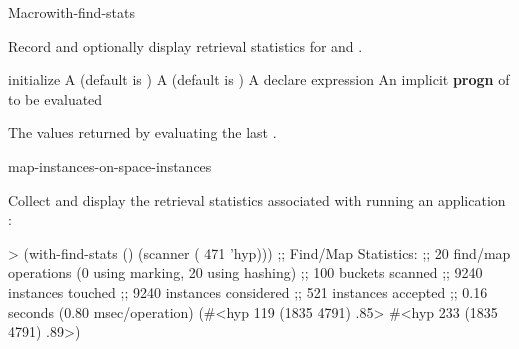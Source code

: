 \documentclass[10pt,twoside,english,pdftex]{article}
\begin{document}
\begin{functiondoc}{Macro}{with-find-stats}%
  {\code{(} \code{)}
    \superstar{}
    \superstar{} 
    \returns{} \superstar}
%
%
%
%
  
\fnsyntax

\fnpurpose 
{}%
%
Record and optionally display retrieval statistics for 
\textbf{} and
\textbf{}.

\fnpackage {}

\fnmodule {}

\fnargs
\begin{args}{initialize}
\arg[initialize] A (default is )
\arg[report] A (default is )
\arg[declaration] A declare expression
\arg[forms] An implicit \textbf{progn} of  to be evaluated
\end{args}

\fnreturns The values returned by evaluating the last .

\begin{alsos}{map-instances-on-space-instances}
\end{alsos}

\fnexample
{}%
Collect and display the retrieval statistics associated with
running an application  :
\begin{example}
> (with-find-stats ()
     (scanner ( 471 'hyp)))
;; Find/Map Statistics:
;;        20 find/map operations (0 using marking, 20 using hashing)
;;       100 buckets scanned
;;      9240 instances touched
;;      9240 instances considered
;;       521 instances accepted
;;      0.16 seconds (0.80 msec/operation)
(#<hyp 119 (1835 4791) .85>
 #<hyp 233 (1835 4791) .89>)
\end{example}

\end{functiondoc}

\end{document}

